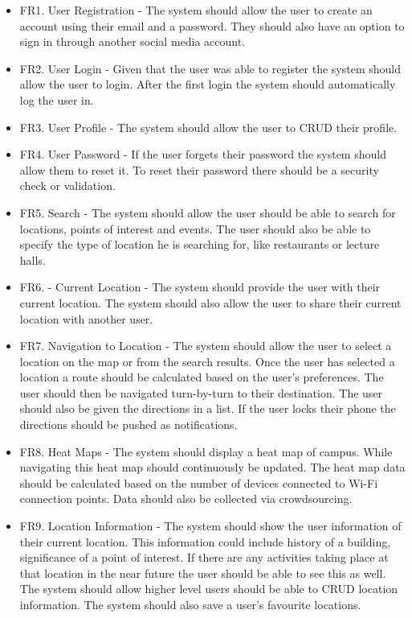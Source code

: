 \documentclass[11pt]{article}
\begin{document}
	\begin{itemize}
		\item FR1. User Registration - The system should allow the user to create an account using their email and a password. They should also have an option to sign in through another social media account.
		
		\item FR2. User Login - Given that the user was able to register the system should allow the user to login. After the first login the system should automatically log the user in.
		
		\item FR3. User Profile - The system should allow the user to CRUD their profile.
		
		\item FR4. User Password - If the user forgets their password the system should allow them to reset it. To reset their password there should be a security check or validation.
		
		\item FR5. Search - The system should allow the user should be able to search for locations, points of interest and events. The user should also be able to specify the type of location he is searching for, like restaurants or lecture halls.
		
		\item FR6. - Current Location - The system should provide the user with their current location. The system should also allow the user to share their current location with another user.
		
		\item FR7. Navigation to Location - The system should allow the user to select a location on the map or from the search results. Once the user has selected a location a route should be calculated based on the user's preferences. The user should then be navigated turn-by-turn to their destination. The user should also be given the directions in a list. If the user locks their phone the directions should be pushed as notifications.
		
		\item FR8. Heat Maps - The system should display a heat map of campus. While navigating this heat map should continuously be updated. The heat map data should be calculated based on the number of devices connected to Wi-Fi connection points. Data should also be collected via crowdsourcing. 
		
		\item FR9. Location Information - The system should show the user information of their current location. This information could include history of a building, significance of a point of interest. If there are any activities taking place at that location in the near future the user should be able to see this as well. The system should allow higher level users should be able to CRUD location information. The system should also save a user's favourite locations.
		

\end{itemize}
\end{document}
